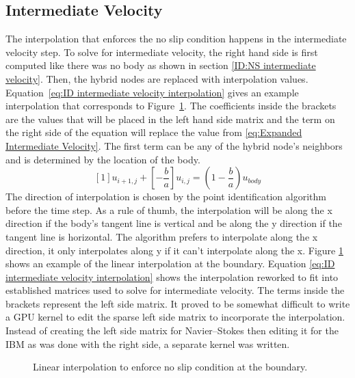 \documentclass[onehalf,11pt]{beavtex}
\begin{document}
\subsection{Intermediate Velocity}
\label{sec:ID fadlun intermediate velocity}
The interpolation that enforces the no slip condition happens in the intermediate velocity step. 
To solve for intermediate velocity, the right hand side is first computed like there was no body as shown in section \ref{ID:NS intermediate velocity}. 
Then, the hybrid nodes are replaced with interpolation values. 
Equation~\eqref{eq:ID intermediate velocity interpolation} gives an example interpolation that corresponds to Figure~\ref{fig:ID linear interpolation}. 
The coefficients inside the brackets are the values that will be placed in the left hand side matrix and the term on the right side of the equation will replace the value from \ref{eq:Expanded Intermediate Velocity}. 
The first term can be any of the hybrid node's neighbors and is determined by the location of the body. 
\begin{equation}
\left[1\right]u_{i+1,j} + \left[-\frac{b}{a}\right]u_{i,j} = \left(1-\frac{b}{a}\right)u_{body}
\label{eq:ID intermediate velocity interpolation}
\end{equation}
The direction of interpolation is chosen by the point identification algorithm before the time step. 
As a rule of thumb, the interpolation will be along the x direction if the body's tangent line is vertical and be along the y direction if the tangent line is horizontal. 
The algorithm prefers to interpolate along the x direction, it only interpolates along y if it can't interpolate along the x. 
Figure \ref{fig:ID linear interpolation} shows an example of the linear interpolation at the boundary. 
Equation \eqref{eq:ID intermediate velocity interpolation} shows the interpolation reworked to fit into established matrices used to solve for intermediate velocity. 
The terms inside the brackets represent the left side matrix. 
It proved to be somewhat difficult to write a GPU kernel to edit the sparse left side matrix to incorporate the interpolation. 
Instead of creating the left side matrix for Navier--Stokes then editing it for the IBM as was done with the right side, a separate kernel was written. 

\begin{figure}[!htb]
	\centering
	
	\caption{Linear interpolation to enforce no slip condition at the boundary.}
	\label{fig:ID linear interpolation}
\end{figure}
\end{document}
